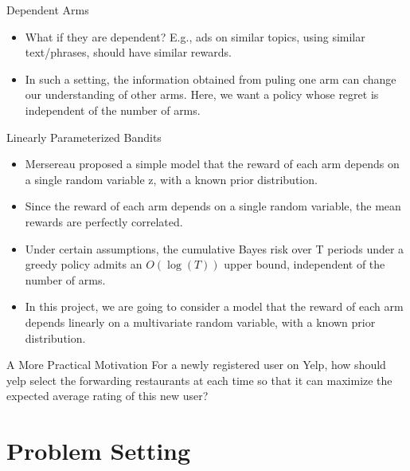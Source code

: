 \documentclass[serif]{beamer}
\begin{document}
\begin{frame}{Dependent Arms}
\begin{itemize}
\item <1-> What if they are dependent? E.g., ads on similar topics, using similar text/phrases, should have similar rewards.
\item <2-> In such a setting, the information obtained from puling one arm can change our understanding of other arms. Here, we want a policy whose regret is independent of the number of arms. 
\end{itemize}
\end{frame}

\begin{frame}{Linearly Parameterized Bandits}
\begin{itemize}
\item <1-> Mersereau proposed a simple model that the reward of each arm depends on a single random variable z, with a known prior distribution. 
\item <2-> Since the reward of each arm depends on a single random variable, the mean rewards are perfectly correlated.
\item <3-> Under certain assumptions, the cumulative Bayes risk over T periods under a greedy policy admits an $O(\log(T))$ upper bound, independent of the number of arms.
\item <4-> In this project, we are going to consider a model that the reward of each arm depends linearly on a multivariate random variable, with a known prior distribution.
\end{itemize}
\end{frame}

\begin{frame}{A More Practical Motivation}
For a newly registered user on Yelp, how should yelp select the forwarding restaurants at each time so that it can maximize the expected average rating of this new user?
\end{frame}





\section{Problem Setting}
\end{document}
